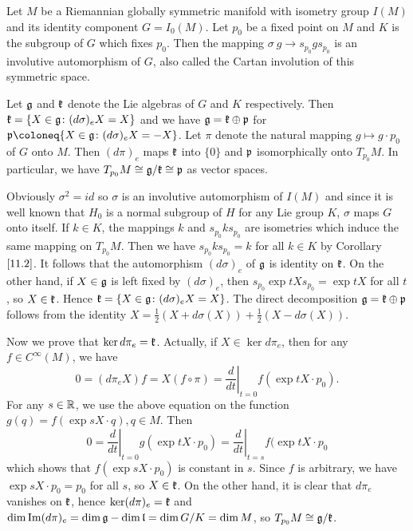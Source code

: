 \begin{theorem}
	 Let $M$ be a Riemannian globally symmetric manifold with
	 isometry group $I(M)$ and its identity component $G =
	 I_0(M)$. Let $p_0$ be a fixed point on $M$ and $K$ is the
	 subgroup of $G$ which fixes $p_0$. Then the mapping
	 $\sigma\:g\to s_{p_0}gs_{p_0}$ is an involutive automorphism
	 of $G$, also called the Cartan involution of this symmetric
	 space.
	 
	 Let ${\mathfrak g}$ and ${\mathfrak k}$ denote the Lie algebras of $G$ and $K$
	 respectively. Then ${\mathfrak k} = \{ X \in {\mathfrak g}\colon(d\sigma)_eX = X\}$
	 and  we have ${\mathfrak g} = {\mathfrak k}\oplus{\mathfrak p}$ for $\ssp\coloneq \{X\in
	 \ssg\:(d\sigma)_eX = -X\}$. Let $\pi $ denote the natural
	 mapping $g\mapsto g\cdot p_0$ of $G$ onto $M$. Then
	 $(d\pi)_e$ maps ${\mathfrak k}$ into $\{0\}$ and ${\mathfrak p}$
	 isomorphically onto $T_{p_0}M$. In particular, we have
	 $T_{p_0}M\cong {\mathfrak g}/{\mathfrak k}\cong {\mathfrak p}$ as vector spaces.
\end{theorem}
\bproof
Obviously $\sigma^2 = id$ so $\sigma$ is an involutive
automorphism of $I(M)$ and since it is well known that $H_0$ is a
normal subgroup of $H$ for any Lie group $K$, $\sigma$ maps $G$
onto itself.  If $k\in K$, the mappings $k$ and $s_{p_0}ks_{p_0}$
are isometries which induce the same mapping on $T_{p_0}M$. Then
we have $s_{p_0}ks_{p_0} = k$ for all $k\in K$ by Corollary
$\ref{11.2}$. It follows that the automorphism $(d\sigma)_e$ of
${\mathfrak g}$ is identity on ${\mathfrak k}$. On the other hand, if $X\in {\mathfrak g}$
is left fixed by $(d\sigma)_e$, then $s_{p_0}\exp tX s_{p_0} =
\exp tX$ for all $t$, so $X\in {\mathfrak k}$. Hence ${\mathfrak k} = \{X\in
{\mathfrak g}\colon(d\sigma)_eX = X\}$.
The direct decomposition ${\mathfrak g} = {\mathfrak k}\oplus{\mathfrak p}$ follows from the
identity $X = \frac{1}{2}(X+d\sigma
(X))+\frac{1}{2}(X-d\sigma(X))$.

Now we prove that $\ker d\pi_e = {\mathfrak k}$. Actually, if $X\in \ker
d\pi_e$,  then for any $f\in C^{\infty}(M)$, we have 
\[0 = (d\pi_eX)f = X(f\circ
\pi)=\left.\frac{d}{dt}\right|_{t=0}f(\exp tX\cdot p_0).
\]
For any $s \in {\mathbb R}$, we use the above equation on the function
$g(q)=f(\exp sX \cdot q), q\in M$. Then
\[
0=\left.\frac{d}{dt}\right|_{t=0}g(\exp tX\cdot
p_0)=\left.\frac{d}{dt}\right|_{t=s}f(\exp tX\cdot p_0
\]
which shows that $f(\exp sX\cdot p_0)$ is constant in $s$. Since
$f$ is arbitrary, we have $\exp sX\cdot p_0 = p_0$ for all $s$,
so $X\in {\mathfrak k}$. On the other hand, it is clear that $d\pi_e$
vanishes on ${\mathfrak k}$, hence $\ker(d\pi)_e={\mathfrak k}$ and
$\dim\mathrm{Im}(d\pi)_e = \dim{\mathfrak g}-\dim{\mathfrak l} = \dim G/K = \dim
M$, so $T_{p_0}M\cong {\mathfrak g}/{\mathfrak k}$.
\eproof


